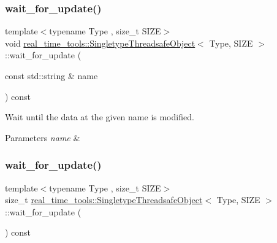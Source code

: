 \subsubsection{\texorpdfstring{wait\+\_\+for\+\_\+update()}{wait\_for\_update()}\hspace{0.1cm}{\footnotesize\ttfamily [2/3]}}
{\footnotesize\ttfamily template$<$typename Type , size\+\_\+t S\+I\+ZE$>$ \\
void \hyperlink{classreal__time__tools_1_1SingletypeThreadsafeObject}{real\+\_\+time\+\_\+tools\+::\+Singletype\+Threadsafe\+Object}$<$ Type, S\+I\+ZE $>$\+::wait\+\_\+for\+\_\+update (\begin{DoxyParamCaption}\item[{const std\+::string \&}]{name }\end{DoxyParamCaption}) const\hspace{0.3cm}{\ttfamily [inline]}}



Wait until the data at the given name is modified. 


\begin{DoxyParams}{Parameters}
{\em name} & \\
\hline
\end{DoxyParams}
\mbox{\label{classreal__time__tools_1_1SingletypeThreadsafeObject_a4d77aeca1b3789cc97f49ff2dd4c6562}} 
\subsubsection{\texorpdfstring{wait\+\_\+for\+\_\+update()}{wait\_for\_update()}\hspace{0.1cm}{\footnotesize\ttfamily [3/3]}}
{\footnotesize\ttfamily template$<$typename Type , size\+\_\+t S\+I\+ZE$>$ \\
size\+\_\+t \hyperlink{classreal__time__tools_1_1SingletypeThreadsafeObject}{real\+\_\+time\+\_\+tools\+::\+Singletype\+Threadsafe\+Object}$<$ Type, S\+I\+ZE $>$\+::wait\+\_\+for\+\_\+update (\begin{DoxyParamCaption}{ }\end{DoxyParamCaption}) const}



